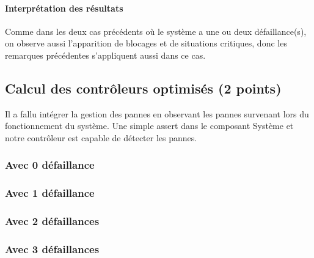 \documentclass[a4paper]{book}
\begin{document}
\paragraph{Interprétation des résultats}
Comme dans les deux cas précédents où le système a une ou deux défaillance(s), on observe aussi l'apparition de blocages et de situations critiques, donc les remarques précédentes s'appliquent aussi dans ce cas.

\subsection{Calcul des contrôleurs optimisés (2 points)}
Il a fallu intégrer la gestion des pannes en observant les pannes survenant lors du fonctionnement du système. Une simple assert dans le composant Système et notre contrôleur est capable de détecter les pannes.

\subsubsection{Avec 0 défaillance}






\subsubsection{Avec 1 défaillance }






\subsubsection{Avec 2 défaillances }






\subsubsection{Avec 3 défaillances }





\end{document}
